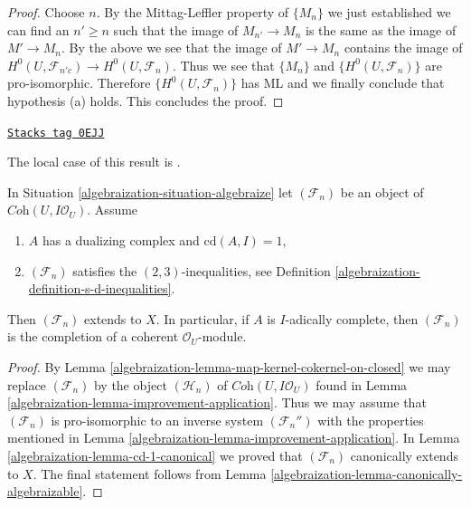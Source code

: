 \begin{proof}
\medskip\noindent
Choose $n$. By the Mittag-Leffler property of $\{M_n\}$ we just established
we can find an $n' \geq n$ such that the image of $M_{n'} \to M_n$
is the same as the image of $M' \to M_n$. By the above we see that
the image of $M' \to M_n$ contains the image of
$H^0(U, \mathcal{F}_{n'c}) \to H^0(U, \mathcal{F}_n)$.
Thus we see that $\{M_n\}$ and $\{H^0(U, \mathcal{F}_n)\}$
are pro-isomorphic. Therefore $\{H^0(U, \mathcal{F}_n)\}$
has ML and we finally conclude that hypothesis (a) holds.
This concludes the proof.
\end{proof}

\begin{proposition}

\label{algebraization-proposition-cd-1}
\href{https://stacks.math.columbia.edu/tag/0EJJ}{\texttt{Stacks tag 0EJJ}}

\begin{reference}
The local case of this result is \cite[IV Corollaire 2.9]{MRaynaud-book}.
\end{reference}
In Situation \ref{algebraization-situation-algebraize} let $(\mathcal{F}_n)$
be an object of $\textit{Coh}(U, I\mathcal{O}_U)$. Assume
\begin{enumerate}
\item $A$ has a dualizing complex and $\text{cd}(A, I) = 1$,
\item $(\mathcal{F}_n)$ satisfies the $(2, 3)$-inequalities, see
Definition \ref{algebraization-definition-s-d-inequalities}.
\end{enumerate}
Then $(\mathcal{F}_n)$ extends to $X$. In particular, if $A$ is
$I$-adically complete, then $(\mathcal{F}_n)$ is the completion
of a coherent $\mathcal{O}_U$-module.
\end{proposition}

\begin{proof}

By Lemma \ref{algebraization-lemma-map-kernel-cokernel-on-closed}
we may replace $(\mathcal{F}_n)$ by the object $(\mathcal{H}_n)$
of $\textit{Coh}(U, I\mathcal{O}_U)$ found in
Lemma \ref{algebraization-lemma-improvement-application}.
Thus we may assume that $(\mathcal{F}_n)$ is pro-isomorphic
to an inverse system $(\mathcal{F}_n'')$ with the properties
mentioned in Lemma \ref{algebraization-lemma-improvement-application}.
In Lemma \ref{algebraization-lemma-cd-1-canonical} we proved that
$(\mathcal{F}_n)$ canonically extends to $X$.
The final statement follows from Lemma \ref{algebraization-lemma-canonically-algebraizable}.
\end{proof}

